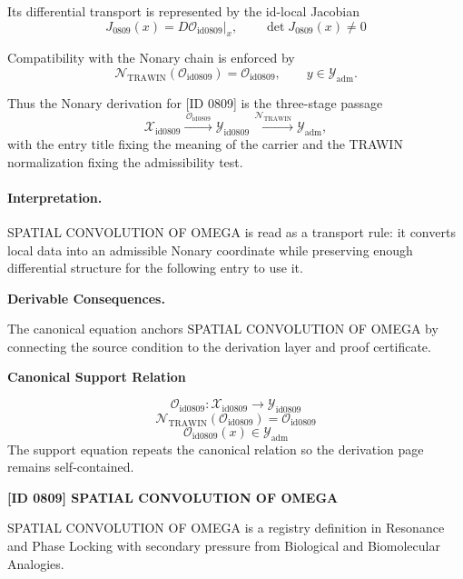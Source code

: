 Its differential transport is represented by the id-local Jacobian\[
J_{0809}(x)=D\mathcal{O}_{\mathrm{id0809}}\big|_x,\qquad \det J_{0809}(x)\neq 0
\]

Compatibility with the Nonary chain is enforced by\[
\mathcal{N}_{\mathrm{TRAWIN}}(\mathcal{O}_{\mathrm{id0809}})=\mathcal{O}_{\mathrm{id0809}},\qquad y\in\mathcal{Y}_{\mathrm{adm}}.
\]

Thus the Nonary derivation for [ID 0809] is the three-stage passage
\[
\mathcal{X}_{\mathrm{id0809}}\xrightarrow{\,\mathcal{O}_{\mathrm{id0809}}\,} \mathcal{Y}_{\mathrm{id0809}}\xrightarrow{\,\mathcal{N}_{\mathrm{TRAWIN}}\,} \mathcal{Y}_{\mathrm{adm}},
\]
with the entry title fixing the meaning of the carrier and the TRAWIN normalization fixing the admissibility test.

\paragraph{Interpretation.} SPATIAL CONVOLUTION OF OMEGA is read as a transport rule: it converts local data into an admissible Nonary coordinate while preserving enough differential structure for the following entry to use it.

\par\vspace{0.35em}
\noindent\textbf{Derivable Consequences.}\quad
\begingroup
\footnotesize
\raggedright
The canonical equation anchors SPATIAL CONVOLUTION OF OMEGA by connecting the source condition to the derivation layer and proof certificate.
\par\endgroup

\noindent\textbf{Canonical Support Relation}\par
\[
\mathcal{O}_{\mathrm{id0809}}:\mathcal{X}_{\mathrm{id0809}}\longrightarrow\mathcal{Y}_{\mathrm{id0809}}
\]
\[
\mathcal{N}_{\mathrm{TRAWIN}}(\mathcal{O}_{\mathrm{id0809}})=\mathcal{O}_{\mathrm{id0809}}
\]
\[
\mathcal{O}_{\mathrm{id0809}}(x)\in\mathcal{Y}_{\mathrm{adm}}
\]
\noindent The support equation repeats the canonical relation so the derivation page remains self-contained.\par

\clearpage
\noindent\textbf{[ID 0809] SPATIAL CONVOLUTION OF OMEGA}\par
\vspace{0.35em}
\begingroup\small
{}
SPATIAL CONVOLUTION OF OMEGA is a registry definition in Resonance and Phase Locking with secondary pressure from Biological and Biomolecular Analogies.


